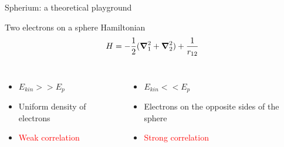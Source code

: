 \documentclass[xcolor=x11names,compress]{beamer}
\renewcommand{\(}{\begin{columns}}
\renewcommand{\)}{\end{columns}}
\newcommand{\<}[1]{\begin{column}{#1}}
\renewcommand{\>}{\end{column}}
\begin{document}
\begin{frame}{Spherium: a theoretical playground}

\begin{beamerboxesrounded}[scheme=foncé]{\centering Two electrons on a sphere Hamiltonian}
\begin{equation*}
    H=-\frac{1}{2}(\grad_1^2 + \grad_2^2) + \frac{1}{r_{12}}
\end{equation*} 
\end{beamerboxesrounded}
\vspace{0.5cm}

\begin{columns}


\vspace{0.5cm}

\begin{itemize}
    \item $E_{kin} >> E_p$
    \item Uniform density of electrons
    \item \textcolor{red}{Weak correlation}
\end{itemize}

\vspace{0.5cm}


\vspace{0.5cm}

\begin{itemize}
    \item $E_{kin} << E_p$
    \item Electrons on the opposite sides of the sphere
    \item \textcolor{red}{Strong correlation}
    \end{itemize}

\end{columns}

\end{frame}
\end{document}
